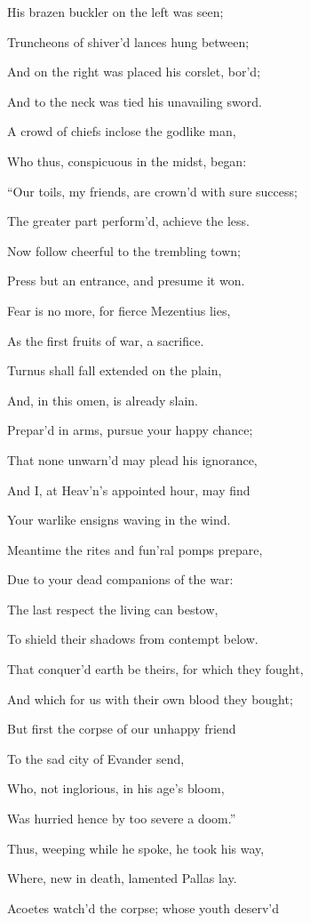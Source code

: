 His brazen buckler on the left was seen;

Truncheons of shiver’d lances hung between;

And on the right was placed his corslet, bor’d;

And to the neck was tied his unavailing sword.

A crowd of chiefs inclose the godlike man,

Who thus, conspicuous in the midst, began:

“Our toils, my friends, are crown’d with sure success;

The greater part perform’d, achieve the less.

Now follow cheerful to the trembling town;

Press but an entrance, and presume it won.

Fear is no more, for fierce Mezentius lies,

As the first fruits of war, a sacrifice.

Turnus shall fall extended on the plain,

And, in this omen, is already slain.

Prepar’d in arms, pursue your happy chance;

That none unwarn’d may plead his ignorance,

And I, at Heav’n’s appointed hour, may find

Your warlike ensigns waving in the wind.

Meantime the rites and fun’ral pomps prepare,

Due to your dead companions of the war:

The last respect the living can bestow,

To shield their shadows from contempt below.

That conquer’d earth be theirs, for which they fought,

And which for us with their own blood they bought;

But first the corpse of our unhappy friend

To the sad city of Evander send,

Who, not inglorious, in his age’s bloom,

Was hurried hence by too severe a doom.”

Thus, weeping while he spoke, he took his way,

Where, new in death, lamented Pallas lay.

Acoetes watch’d the corpse; whose youth deserv’d

